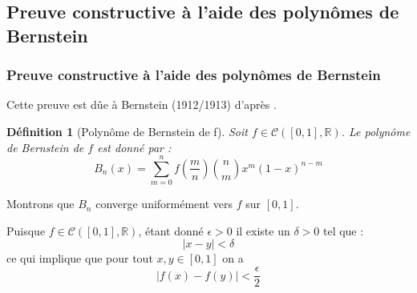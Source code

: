 \documentclass[
	10pt, %
	xcolor={svgnames}
]{beamer}
\newtheorem{defi}[subsubsection]{Définition}
\begin{document}
\begin{frame}
	\section{Preuve constructive à l'aide des polynômes de Bernstein}
	\frametitle{Preuve constructive à l'aide des polynômes de Bernstein}

	Cette preuve est dûe à Bernstein (1912/1913) d'après \cite[p.~ 42-45]{pinkus2000approximation}.
	\begin{defi}[Polynôme de Bernstein de f]
		Soit \( f \in \mathcal{C}([0,1],\mathbb{R}) \). Le polynôme de Bernstein de \( f \) est donné par :
	\begin{equation*}
		B_n(x) = \sum_{m=0}^{n} f(\frac{m}{n}) \binom{n}{m} x^{m}(1-x)^{n-m}
	\end{equation*}
	\end{defi}
Montrons que \( B_n \) converge uniformément vers \( f \) sur \( [0,1] \).


	Puisque \( f \in \mathcal{C}([0,1],\mathbb{R}) \), étant donné \( \epsilon > 0 \) il existe un \( \delta > 0 \) tel que :
	\begin{equation*}
		{\left\lvert x - y\right\rvert} < \delta
	\end{equation*}
	ce qui implique que pour tout \( x, y \in [0,1] \) on a 
	\begin{equation*}
		{\left\lvert f(x) - f(y) \right\rvert} < \frac{\epsilon}{2}
	\end{equation*}

\end{frame}
\end{document}
